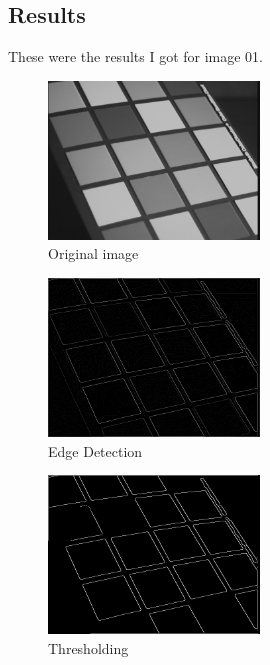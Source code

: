 \newpage
\subsection{Results}

These were the results I got for image 01.

\begin{figure}[h]
  \includegraphics[width=0.5\textwidth]{img01.jpg}
  \caption{Original image}
  \label{fig:original}
\end{figure}


\begin{figure}[h!]
  \includegraphics*[width=0.5\textwidth]{01-edge.png}
  \caption{Edge Detection}
  \label{fig:edge}
\end{figure}

\begin{figure}[h!]
  \includegraphics*[width=0.5\textwidth]{01-threshold.png}
  \caption{Thresholding}
  \label{fig:threshold}
\end{figure}

